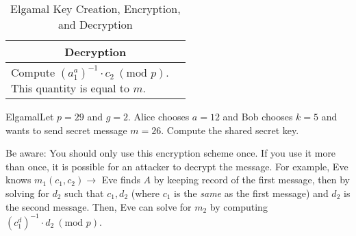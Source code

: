 \begin{table}[h!]
\begin{tabular}{@{}p{}l@{}}
        \multicolumn{2}{c}{\parbox[t]{0.9\textwidth}{\centering\textbf{Decryption}}}                                                                                                                    \\ \midrule
        \multicolumn{1}{l}{\parbox[t]{0.45\textwidth}{Compute \((a_1^a)^{-1} \cdot c_2 \ (\text{mod } p)\).\\  This quantity is equal to \(m\).}}                     &                                                                                             \\ \bottomrule
    \end{tabular}
    \caption{Elgamal Key Creation, Encryption, and Decryption}
\end{table}

\begin{example}
    {Elgamal}Let \(p = 29\) and \(g = 2\). Alice chooses \(a = 12\) and Bob chooses \(k = 5\) and wants to send secret message \(m = 26\). Compute the shared secret key.
\end{example}


\begin{note}
    Be aware: You should only use this encryption scheme once. If you use it more than once, it is possible for an attacker to decrypt the message. For example, Eve knows \(m_1(c_1, c_2) \rightarrow\) Eve finds \(A\) by keeping record of the first message, then by solving for \(d_2\) such that \(c_1, d_2\) (where \(c_1\) is the \textit{same} as the first message) and \(d_2\) is the second message. Then, Eve can solve for \(m_2\) by computing \((c_1^d)^{-1} \cdot d_2 \ (\text{mod } p)\).
\end{note}